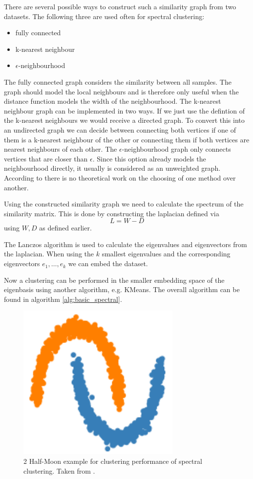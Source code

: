There are several possible ways to construct such a similarity graph from two datasets.
The following three are used often for spectral clustering:
\begin{itemize}
  \item fully connected
  \item k-nearest neighbour
  \item \(\epsilon\)-neighbourhood
\end{itemize}
The fully connected graph considers the similarity between all samples. The graph should model the local neighbours and is therefore only useful when the distance function
models the width of the neighbourhood.
The k-nearest neighbour graph can be implemented in two ways. If we just use the defintion of the k-nearest neighbours we would receive a directed graph.
To convert this into an undirected graph we can decide between connecting both vertices if one of them is a k-nearest neighbour of the other or connecting them if both vertices are nearest neighbours of each other.
The \(\epsilon\)-neighbourhood graph only connects vertices that are closer than \(\epsilon\).
Since this option already models the neighbourhood directly, it usually is considered as an unweighted graph. \cite{von_luxburg_tutorial_2007}
According to \cite{von_luxburg_tutorial_2007} there is no theoretical work on the choosing of one method over
another.

Using the constructed similarity graph we need to calculate the spectrum of the similarity matrix.
This is done by constructing the laplacian defined via
\[L = W - D\]
using \(W, D\) as defined earlier.

The Lanczos algorithm \cite{lanczos_iteration_1950} is used to calculate the eigenvalues and eigenvectors from the laplacian.
When using the \(k\) smallest eigenvalues and the corresponding eigenvectors \(e_1, \ldots, e_k\) we can embed the dataset.

Now a clustering can be performed in the smaller embedding space of the eigenbasis using another algorithm, e.g. KMeans.
The overall algorithm can be found in algorithm \ref{alg:basic_spectral}.

\begin{figure}
  \includegraphics{images/spectral_example.png}
  \caption{2 Half-Moon example for clustering performance of spectral clustering. Taken from \cite{noauthor_23_2020}.}
  \label{fig:spectral_example}
\end{figure}

